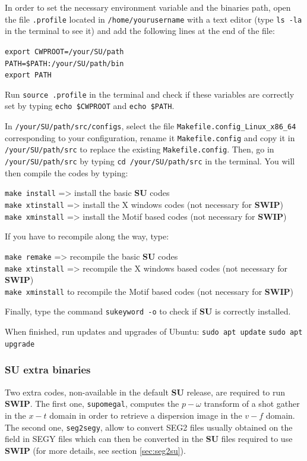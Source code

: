 \documentclass[twoside,a4paper]{article}
\def\SWIP{\textbf{SWIP}}
\def\SU{\textbf{SU}}
\begin{document}
In order to set the necessary environment variable and the binaries path, open the file \verb|.profile| located in \verb|/home/yourusername| with a text editor (type \verb|ls -la| in the terminal to see it) and add the following lines at the end of the file:

\verb|export CWPROOT=/your/SU/path|\\
\verb|PATH=$PATH:/your/SU/path/bin|\\
\verb|export PATH|

Run \verb|source .profile| in the terminal and check if these variables are correctly set by typing \verb|echo $CWPROOT| and \verb|echo $PATH|.

In \verb|/your/SU/path/src/configs|, select the file \verb|Makefile.config_Linux_x86_64| corresponding to your configuration, rename it \verb|Makefile.config| and copy it in \verb|/your/SU/path/src| to replace the existing \verb|Makefile.config|. Then, go in \verb|/your/SU/path/src| by typing \verb|cd /your/SU/path/src| in the terminal. You will then compile the codes by typing:

\verb|make install| => install the basic {\SU} codes\\
\verb|make xtinstall| => install the X windows codes (not necessary for {\SWIP})\\
\verb|make xminstall| => install the Motif based codes (not necessary for {\SWIP})

If you have to recompile along the way, type:

\verb|make remake| => recompile the basic {\SU} codes\\
\verb|make xtinstall| => recompile the X windows based codes (not necessary for {\SWIP})\\
\verb|make xminstall| to recompile the Motif based codes (not necessary for {\SWIP})

Finally, type the command \verb|sukeyword -o| to check if {\SU} is correctly installed.

When finished, run updates and upgrades of Ubuntu:
\verb|sudo apt update|
\verb|sudo apt upgrade|

\subsubsection{SU extra binaries}
Two extra codes, non-available in the default {\SU} release, are required to run {\SWIP}. The first one, \verb|supomegal|, computes the $p-\omega$ transform of a shot gather in the $x-t$ domain in order to retrieve a dispersion image in the $v-f$ domain. The second one, \verb|seg2segy|, allow to convert SEG2 files usually obtained on the field in SEGY files which can then be converted in the {\SU} files required to use {\SWIP} (for more details, see section \ref{sec:seg2su}).
\end{document}
